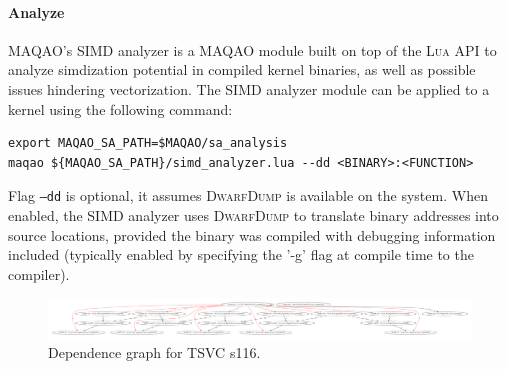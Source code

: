 \documentclass[11pt, a4paper, twoside]{montblanc2}
\def\lua{\textsc{Lua}\xspace}
\def\dd{\textsc{DwarfDump}\xspace}
\begin{document}
\paragraph{Analyze}

MAQAO's SIMD analyzer is a MAQAO module built on top of the \lua API to analyze
simdization potential in compiled kernel binaries, as well as possible issues
hindering vectorization. The SIMD analyzer module can be applied to a kernel
using the following command:

\begin{verbatim}
export MAQAO_SA_PATH=$MAQAO/sa_analysis
maqao ${MAQAO_SA_PATH}/simd_analyzer.lua --dd <BINARY>:<FUNCTION>
\end{verbatim}

Flag \texttt{--dd} is optional, it assumes \dd is available on the system. When
enabled, the SIMD analyzer uses \dd to translate binary addresses into source
locations, provided the binary was compiled with debugging information included
(typically enabled by specifying the '-g' flag at compile time to the compiler).

\begin{figure}[h]
  \centering
\includegraphics[width=1\textwidth]{fs116_l47}
\caption{Dependence graph for TSVC s116.}\label{fig:dgs116}
\end{figure}
\end{document}
